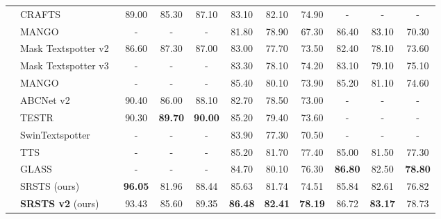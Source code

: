 \begin{table*}[t]
\begin{tabular}{l|l|ccccccccc}
     &CRAFTS~\cite{baek2020character}  &89.00  & 85.30& 87.10&  83.10 & 82.10 &74.90 &- &- & - \\
     &MANGO~\cite{qiao2020mango} & -&  - & - & 81.80 &78.90&  67.30 & 86.40 & 83.10&  70.30  \\
     \midrule
     &Mask Textspotter v2~\cite{liao2019mask}  & 86.60& 87.30& 87.00& 83.00& 77.70& 73.50& 82.40& 78.10& 73.60\\
     &Mask Textspotter v3~\cite{liao2020mask}  & -& -& -& 83.30& 78.10& 74.20&83.10&79.10& 75.10\\
     &MANGO~\cite{qiao2020mango} &-& -& -& 85.40& 80.10& 73.90&85.20&81.10& 74.60\\ 
     &ABCNet v2~\cite{liu2021abcnet} & 90.40&86.00& 88.10& 82.70& 78.50& 73.00&-&-& -\\
     &TESTR~\cite{zhang2022text} & 90.30 & \textbf{89.70} & \textbf{90.00} & 85.20 & 79.40& 73.60 &- & - & -\\
     &SwinTextspotter~\cite{huang2022swintextspotter}&-& -& -& 83.90 &77.30  &70.50&-& -& - \\
     &TTS~\cite{kittenplon2022towards}  &- &- & -& 85.20 &81.70 &77.40 &85.00 &81.50& 77.30\\ &GLASS~\cite{ronen2022glass}&-&- &- & 84.70& 80.10 & 76.30&\textbf{86.80}& 82.50& \textbf{78.80}\\
     &SRSTS (ours)~\cite{wu2022decoupling}  &\textbf{96.05}& 81.96 &  88.44 & 85.63 & 81.74 &  74.51&  85.84 & 82.61 & 76.82\\ 
&\textbf{SRSTS v2} (ours) &93.43 &85.60 & 89.35& \textbf{86.48}&\textbf{82.41} &\textbf{78.19} &86.72 &\textbf{83.17} &78.73\\
\bottomrule
  \end{tabular}
\end{table*} 
 


